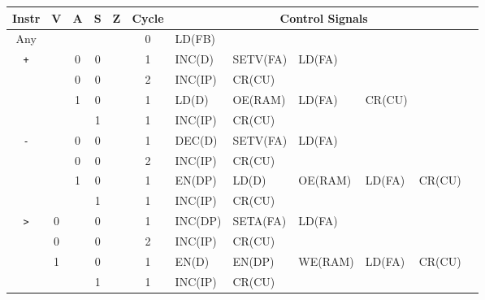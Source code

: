 

  \begin{longtable}[c] {c|cccc|c|llllll}
                     Instr        & V & A & S     & Z    & Cycle & \multicolumn{6}{c}{Control Signals}                      \\ \hline
    \rowcolor{White} Any          &   &   &       &      & 0     & LD(FB)   &          &         &        &        &        \\ \hline
    \rowcolor{Gray}  \texttt{+}   &   & 0 & 0     &      & 1     & INC(D)   & SETV(FA) & LD(FA)  &        &        &        \\
    \rowcolor{Gray}               &   & 0 & 0     &      & 2     & INC(IP)  & CR(CU)   &         &        &        &        \\    
    \rowcolor{White}              &   & 1 & 0     &      & 1     & LD(D)    & OE(RAM)  & LD(FA)  & CR(CU) &        &        \\
    \rowcolor{Gray}               &   &   & 1     &      & 1     & INC(IP)  & CR(CU)   &         &        &        &        \\ \hline
    
    \rowcolor{White} \texttt{-}   &   & 0 & 0     &      & 1     & DEC(D)   & SETV(FA) & LD(FA)  &        &        &        \\
    \rowcolor{White}              &   & 0 & 0     &      & 2     & INC(IP)  & CR(CU)   &         &        &        &        \\
    \rowcolor{Gray}               &   & 1 & 0     &      & 1     & EN(DP)   & LD(D)    & OE(RAM) & LD(FA) & CR(CU) &        \\
    \rowcolor{White}              &   &   & 1     &      & 1     & INC(IP)  & CR(CU)   &         &        &        &        \\ \hline
    
    \rowcolor{Gray}  \texttt{>}   & 0 &   & 0     &      & 1     & INC(DP)  & SETA(FA) & LD(FA)  &        &        &        \\
    \rowcolor{Gray}               & 0 &   & 0     &      & 2     & INC(IP)  & CR(CU)   &         &        &        &        \\
    \rowcolor{White}              & 1 &   & 0     &      & 1     & EN(D)    & EN(DP)   & WE(RAM) & LD(FA) & CR(CU) &        \\
    \rowcolor{Gray}               &   &   & 1     &      & 1     & INC(IP)  & CR(CU)   &         &        &        &        \\ \hline
    

\end{longtable}
